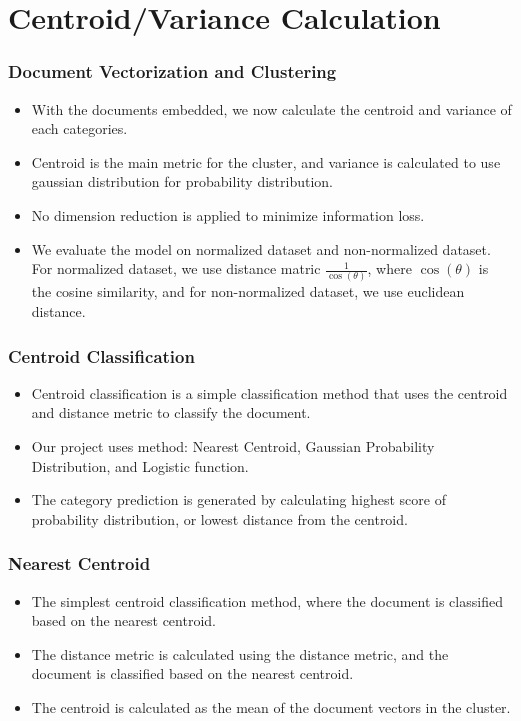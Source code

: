\documentclass[
  10pt %
  16:9, %
]{beamer}
\begin{document}
\section{Centroid/Variance Calculation}
\begin{frame}
  \frametitle{Document Vectorization and Clustering}
  \begin{itemize}
    \item With the documents embedded, we now calculate the centroid and variance of each categories.
    \item Centroid is the main metric for the cluster, and variance is calculated to use gaussian distribution for probability distribution.
    \item No dimension reduction is applied to minimize information loss.
    \item We evaluate the model on normalized dataset and non-normalized dataset. For normalized dataset, we use distance matric $\frac{1}{\cos(\theta)}$, where $\cos(\theta)$ is the cosine similarity, and for non-normalized dataset, we use euclidean distance.
  \end{itemize}
\end{frame}

\begin{frame}
  \frametitle{Centroid Classification}
  \begin{itemize}
    \item Centroid classification is a simple classification method that uses the centroid and distance metric to classify the document.
    \item Our project uses method: Nearest Centroid, Gaussian Probability Distribution, and Logistic function.
    \item The category prediction is generated by calculating highest score of probability distribution, or lowest distance from the centroid.
  \end{itemize}
\end{frame}

\begin{frame}
  \frametitle{Nearest Centroid}
  \begin{itemize}
    \item The simplest centroid classification method, where the document is classified based on the nearest centroid.
    \item The distance metric is calculated using the distance metric, and the document is classified based on the nearest centroid.
    \item The centroid is calculated as the mean of the document vectors in the cluster.
  \end{itemize}
\end{frame}
\end{document}
